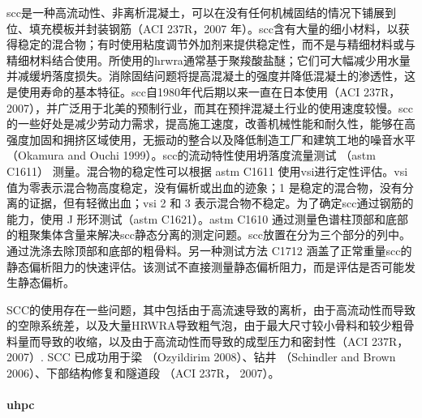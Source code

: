 \acrlong*{scc}是一种高流动性、非离析混凝土，可以在没有任何机械固结的情况下铺展到位、填充模板并封装钢筋（ACI 237R，2007 年）。\acrlong*{scc}含有大量的细小材料，以获得稳定的混合物；有时使用粘度调节外加剂来提供稳定性，而不是与精细材料或与精细材料结合使用。所使用的\acrfull*{hrwra}通常基于聚羧酸盐醚；它们可大幅减少用水量并减缓坍落度损失。消除固结问题将提高混凝土的强度并降低混凝土的渗透性，这是使用寿命的基本特征。\acrlong*{scc}自1980年代后期以来一直在日本使用（ACI 237R，2007），并广泛用于北美的预制行业，而其在预拌混凝土行业的使用速度较慢。\acrlong*{scc}的一些好处是减少劳动力需求，提高施工速度，改善机械性能和耐久性，能够在高强度加固和拥挤区域使用，无振动的整合以及降低制造工厂和建筑工地的噪音水平（Okamura and Ouchi 1999）。\acrlong*{scc}的流动特性使用坍落度流量测试 （\acrshort*{astm} C1611） 测量。混合物的稳定性可以根据 \acrshort*{astm} C1611 使用\acrfull*{vsi}进行定性评估。\acrshort*{vsi} 值为零表示混合物高度稳定，没有偏析或出血的迹象；1 是稳定的混合物，没有分离的证据，但有轻微出血；\acrshort*{vsi} 2 和 3 表示混合物不稳定。为了确定\acrlong*{scc}通过钢筋的能力，使用 J 形环测试（\acrshort*{astm} C1621）。\acrshort*{astm} C1610 通过测量色谱柱顶部和底部的粗聚集体含量来解决\acrlong*{scc}静态分离的测定问题。\acrlong*{scc}放置在分为三个部分的列中。通过洗涤去除顶部和底部的粗骨料。另一种测试方法 C1712 涵盖了正常重量\acrlong*{scc}的静态偏析阻力的快速评估。该测试不直接测量静态偏析阻力，而是评估是否可能发生静态偏析。

SCC的使用存在一些问题，其中包括由于高流速导致的离析，由于高流动性而导致的空隙系统差，以及大量HRWRA导致粗气泡，由于最大尺寸较小骨料和较少粗骨料量而导致的收缩，以及由于高流动性而导致的成型压力和密封性（ACI 237R， 2007）. SCC 已成功用于梁 （Ozyildirim 2008）、钻井 （Schindler and Brown 2006）、下部结构修复和隧道段 （ACI 237R， 2007）。

\paragraph{\acrfull*{uhpc}}

